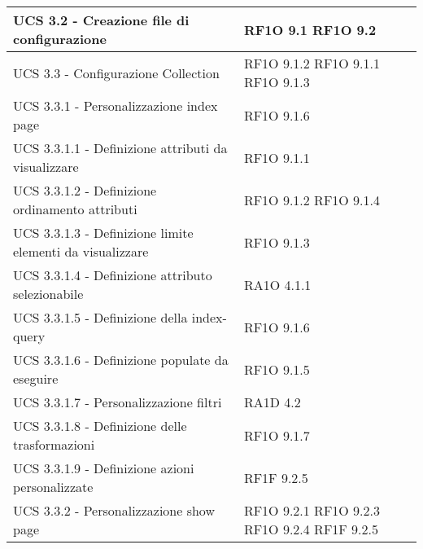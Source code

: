 \begin{center}
\begin{longtable}{ | p{5cm} | p{5cm} |}
            UCS 3.2  - Creazione file di configurazione &  RF1O 9.1 \newline  RF1O 9.2 \newline  \\ \hline      
            UCS 3.3  - Configurazione Collection &  RF1O 9.1.2 \newline  RF1O 9.1.1 \newline  RF1O 9.1.3 \newline  \\ \hline      
            UCS 3.3.1 - Personalizzazione index page &  RF1O 9.1.6 \newline  \\ \hline      
            UCS 3.3.1.1  - Definizione attributi da visualizzare &  RF1O 9.1.1 \newline  \\ \hline      
            UCS 3.3.1.2  -  Definizione ordinamento attributi &  RF1O 9.1.2 \newline  RF1O 9.1.4 \newline  \\ \hline      
            UCS 3.3.1.3  - Definizione limite elementi da visualizzare &  RF1O 9.1.3 \newline  \\ \hline      
            UCS 3.3.1.4 - Definizione attributo selezionabile &  RA1O 4.1.1 \newline  \\ \hline      
            UCS 3.3.1.5 - Definizione della index-query &  RF1O 9.1.6 \newline  \\ \hline      
            UCS 3.3.1.6 - Definizione populate da eseguire &  RF1O 9.1.5 \newline  \\ \hline      
            UCS 3.3.1.7 - Personalizzazione filtri &  RA1D 4.2 \newline  \\ \hline      
            UCS 3.3.1.8 - Definizione delle trasformazioni &  RF1O 9.1.7 \newline  \\ \hline      
            UCS 3.3.1.9 - Definizione azioni personalizzate &  RF1F 9.2.5 \newline  \\ \hline      
            UCS 3.3.2  -  Personalizzazione show page &  RF1O 9.2.1 \newline  RF1O 9.2.3 \newline  RF1O 9.2.4 \newline  RF1F 9.2.5 \newline  \\ \hline      

\end{longtable}
\end{center}
